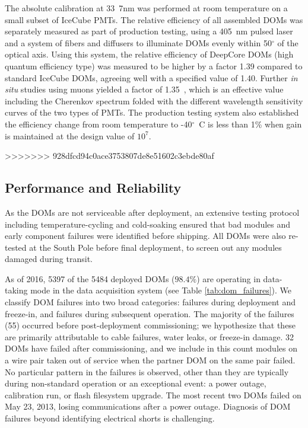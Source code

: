 The absolute calibration at 33~7nm was performed at room temperature
on a small subset of IceCube PMTs. The relative efficiency of all
assembled DOMs was separately measured as part of production testing,
using a 405~nm pulsed laser and a system of fibers and diffusers to
illuminate DOMs evenly within 50$^{\circ}$ of the optical axis.  Using
this system, the relative efficiency of DeepCore DOMs (high quantum
efficiency type) was measured to be higher by a factor 1.39 compared
to standard IceCube DOMs, agreeing well with a specified value of
1.40. Further \textit{in situ}  studies using muons yielded a factor of
1.35~\cite{ICECUBE:DC}, which is an effective value including the
Cherenkov spectrum folded with the different wavelength sensitivity
curves of the two types of PMTs.  The production testing system also
established the efficiency change from room temperature to
-40$^{\circ}$~C is less than 1\% when gain is maintained at the design value of $10^7$.  

>>>>>>> 928dfcd94c0ace3753807de8e51602c3ebde80af


\subsection{Performance and Reliability}

As the DOMs are not serviceable after deployment, an extensive testing
protocol including temperature-cycling and cold-soaking ensured that bad
modules and early component failures were identified before shipping.
All DOMs were also re-tested at the South Pole before final deployment, to
screen out any modules damaged during transit.

As of 2016, 5397 of the 5484 deployed DOMs ($98.4\%$) are operating in
data-taking mode in the data acquisition system (see Table
\ref{tab:dom_failures}).  We classify DOM 
failures into two broad categories: failures during deployment and
freeze-in, and failures during subsequent operation.  The majority of the
failures (55) occurred before post-deployment commissioning; we hypothesize
that these are primarily attributable to cable failures, water leaks,
or freeze-in damage. 32 DOMs have failed after commissioning, and
we include in this count modules on a wire pair taken out of service when
the partner DOM on the same pair failed.  No particular pattern in the
failures is observed, other than they are typically during non-standard
operation or an exceptional event: a power outage, calibration run, or
flash filesystem upgrade.  The most recent two DOMs failed on May 23, 2013,
losing communications after a power outage.  Diagnosis of DOM failures
beyond identifying electrical shorts is challenging.

